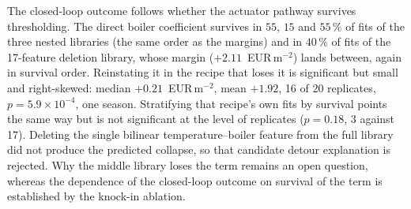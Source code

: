 The closed-loop outcome follows whether the actuator pathway
survives thresholding. The direct boiler coefficient survives in $55$, $15$ and
$55\,\%$ of fits of the three nested libraries (the same order as the margins) and
in $40\,\%$ of fits of the 17-feature deletion library, whose margin
($+2.11$~EUR\,m$^{-2}$) lands between, again in
survival order. Reinstating it in the recipe that loses it is
significant but small and right-skewed: median $+0.21$~EUR\,m$^{-2}$, mean
$+1.92$, 16 of 20 replicates, $p=5.9\times10^{-4}$, one season. Stratifying that
recipe's own fits by survival points the same way but is not significant at the level
of replicates ($p=0.18$, 3 against 17). Deleting the
single bilinear temperature--boiler feature from the full library did not produce the
predicted collapse, so that candidate detour explanation is rejected. Why the middle
library loses the term remains an open question, whereas
the dependence of the closed-loop outcome on survival of the term is established by
the knock-in ablation.

